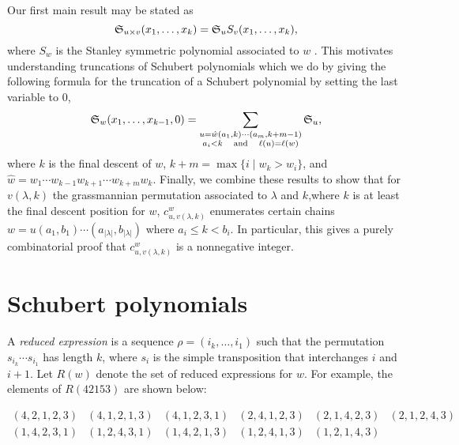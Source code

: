 \documentclass[11pt]{amsart}
\theoremstyle{definition}
\theoremstyle{remark}
\numberwithin{equation}{section}
\newcommand{\R}{\ensuremath{R}}
\newcommand{\schubert}{\ensuremath\mathfrak{S}}
\newcommand{\stanley}{\ensuremath{S}}
\begin{document}
Our first main result may be stated as
\begin{displaymath}
  \schubert_{u \times v}(x_1,\ldots,x_k) = \schubert_u \stanley_{v}(x_1,\ldots,x_k),
\end{displaymath}
where $\stanley_w$ is the Stanley symmetric polynomial associated to $w$ \cite{Sta84}. This motivates understanding truncations of Schubert polynomials which we do by giving the following formula for the truncation of a Schubert polynomial by setting the last variable to $0$,
\begin{displaymath}
  \schubert_w(x_1,\ldots,x_{k-1},0) = \sum_{\substack{u = \hat{w} (a_1,k) \cdots (a_m,k+m-1) \\ a_i < k \hspace{1em} \mathrm{and} \hspace{1em} \ell(u) = \ell(w)}} \schubert_u,
\end{displaymath}
where $k$ is the final descent of $w$, $k+m = \max\{i \mid w_k > w_i\}$, and $\hat{w} = w_1 \cdots w_{k-1} w_{k+1} \cdots w_{k+m} w_k$. Finally, we combine these results to show that for $v(\lambda,k)$ the grassmannian permutation associated to $\lambda$ and $k$,where $k$ is at least the final descent position for $w$, $c^{w}_{u,v(\lambda,k)}$ enumerates certain chains $w = u (a_1,b_1) \cdots (a_{|\lambda|},b_{|\lambda|})$ where $a_i \leq k < b_i$. In particular, this gives a purely combinatorial proof that $c^{w}_{u,v(\lambda,k)}$ is a nonnegative integer.


%
\section{Schubert polynomials}
%
\label{sec:schubert}

A \emph{reduced expression} is a sequence $\rho = (i_k, \ldots, i_1)$ such that the permutation $s_{i_k} \cdots s_{i_1}$ has length $k$, where $s_i$ is the simple transposition that interchanges $i$ and $i+1$. Let $\R(w)$ denote the set of reduced expressions for $w$. For example, the elements of $\R(42153)$ are shown below:

  \begin{displaymath}
    \begin{array}{cccccc}
      (4,2,1,2,3) & (4,1,2,1,3) & (4,1,2,3,1) & (2,4,1,2,3) & (2,1,4,2,3) & (2,1,2,4,3) \\
      (1,4,2,3,1) & (1,2,4,3,1) & (1,4,2,1,3) & (1,2,4,1,3) & (1,2,1,4,3) & 
    \end{array}
  \end{displaymath}
\end{document}
